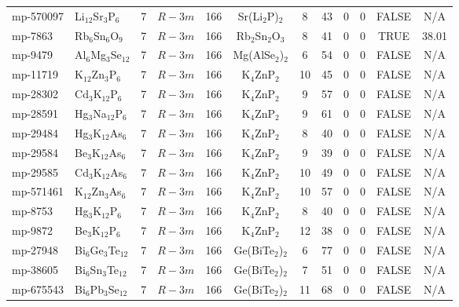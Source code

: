 {\begin{longtable}{llcccccccccc}
    mp-570097 & Li$_{12}$Sr$_{3}$P$_{6}$ & 7     & $R-3m$ & 166   & Sr(Li$_{2}$P)$_{2}$ & 8     & 43    & 0     & 0     & FALSE & N/A \\
    mp-7863 & Rb$_{6}$Sn$_{6}$O$_{9}$ & 7     & $R-3m$ & 166   & Rb$_{2}$Sn$_{2}$O$_{3}$ & 8     & 41    & 0     & 0     & TRUE  & 38.01  \\
    mp-9479 & Al$_{6}$Mg$_{3}$Se$_{12}$ & 7     & $R-3m$ & 166   & Mg(AlSe$_{2}$)$_{2}$ & 6     & 54    & 0     & 0     & FALSE & N/A \\
    mp-11719 & K$_{12}$Zn$_{3}$P$_{6}$ & 7     & $R-3m$ & 166   & K$_{4}$ZnP$_{2}$ & 10    & 45    & 0     & 0     & FALSE & N/A \\
    mp-28302 & Cd$_{3}$K$_{12}$P$_{6}$ & 7     & $R-3m$ & 166   & K$_{4}$ZnP$_{2}$ & 9     & 57    & 0     & 0     & FALSE & N/A \\
    mp-28591 & Hg$_{3}$Na$_{12}$P$_{6}$ & 7     & $R-3m$ & 166   & K$_{4}$ZnP$_{2}$ & 9     & 61    & 0     & 0     & FALSE & N/A \\
    mp-29484 & Hg$_{3}$K$_{12}$As$_{6}$ & 7     & $R-3m$ & 166   & K$_{4}$ZnP$_{2}$ & 8     & 40    & 0     & 0     & FALSE & N/A \\
    mp-29584 & Be$_{3}$K$_{12}$As$_{6}$ & 7     & $R-3m$ & 166   & K$_{4}$ZnP$_{2}$ & 9     & 39    & 0     & 0     & FALSE & N/A \\
    mp-29585 & Cd$_{3}$K$_{12}$As$_{6}$ & 7     & $R-3m$ & 166   & K$_{4}$ZnP$_{2}$ & 10    & 49    & 0     & 0     & FALSE & N/A \\
    mp-571461 & K$_{12}$Zn$_{3}$As$_{6}$ & 7     & $R-3m$ & 166   & K$_{4}$ZnP$_{2}$ & 10    & 57    & 0     & 0     & FALSE & N/A \\
    mp-8753 & Hg$_{3}$K$_{12}$P$_{6}$ & 7     & $R-3m$ & 166   & K$_{4}$ZnP$_{2}$ & 8     & 40    & 0     & 0     & FALSE & N/A \\
    mp-9872 & Be$_{3}$K$_{12}$P$_{6}$ & 7     & $R-3m$ & 166   & K$_{4}$ZnP$_{2}$ & 12    & 38    & 0     & 0     & FALSE & N/A \\
    mp-27948 & Bi$_{6}$Ge$_{3}$Te$_{12}$ & 7     & $R-3m$ & 166   & Ge(BiTe$_{2}$)$_{2}$ & 6     & 77    & 0     & 0     & FALSE & N/A \\
    mp-38605 & Bi$_{6}$Sn$_{3}$Te$_{12}$ & 7     & $R-3m$ & 166   & Ge(BiTe$_{2}$)$_{2}$ & 7     & 51    & 0     & 0     & FALSE & N/A \\
    mp-675543 & Bi$_{6}$Pb$_{3}$Se$_{12}$ & 7     & $R-3m$ & 166   & Ge(BiTe$_{2}$)$_{2}$ & 11    & 68    & 0     & 0     & FALSE & N/A \\

\end{longtable}}
